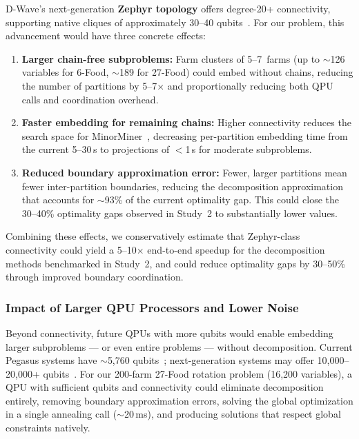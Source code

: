 D-Wave's next-generation \textbf{Zephyr topology} offers degree-20+ connectivity, supporting native cliques of approximately 30--40 qubits~\cite{boothby2021zephyr}. For our problem, this advancement would have three concrete effects:

\begin{enumerate}
    \item \textbf{Larger chain-free subproblems:} Farm clusters of 5--7~farms (up to $\sim$126 variables for 6-Food, $\sim$189 for 27-Food) could embed without chains, reducing the number of partitions by 5--7$\times$ and proportionally reducing both QPU calls and coordination overhead.

    \item \textbf{Faster embedding for remaining chains:} Higher connectivity reduces the search space for MinorMiner~\cite{cai2014practical}, decreasing per-partition embedding time from the current 5--30\,s to projections of $<$1\,s for moderate subproblems.

    \item \textbf{Reduced boundary approximation error:} Fewer, larger partitions mean fewer inter-partition boundaries, reducing the decomposition approximation that accounts for $\sim$93\% of the current optimality gap. This could close the 30--40\% optimality gaps observed in Study~2 to substantially lower values.
\end{enumerate}

Combining these effects, we conservatively estimate that Zephyr-class connectivity could yield a 5--10$\times$ end-to-end speedup for the decomposition methods benchmarked in Study~2, and could reduce optimality gaps by 30--50\% through improved boundary coordination.

\subsubsection{Impact of Larger QPU Processors and Lower Noise}

Beyond connectivity, future QPUs with more qubits would enable embedding larger subproblems --- or even entire problems --- without decomposition. Current Pegasus systems have $\sim$5,760 qubits~\cite{boothby2020next}; next-generation systems may offer 10,000--20,000+ qubits~\cite{boothby2021zephyr}. For our 200-farm 27-Food rotation problem (16,200 variables), a QPU with sufficient qubits and connectivity could eliminate decomposition entirely, removing boundary approximation errors, solving the global optimization in a single annealing call ($\sim$20\,ms), and producing solutions that respect global constraints natively.

